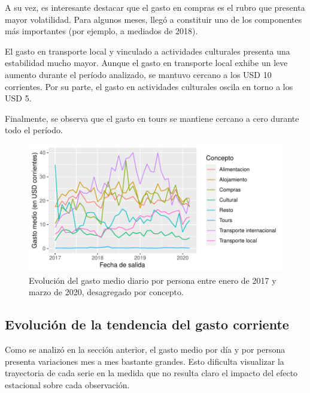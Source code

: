 \documentclass[
]{article}
\begin{document}
A su vez, es interesante destacar que el gasto en compras es el rubro
que presenta mayor volatilidad. Para algunos meses, llegó a constituir
uno de los componentes más importantes (por ejemplo, a mediados de
2018).

El gasto en transporte local y vinculado a actividades culturales
presenta una estabilidad mucho mayor. Aunque el gasto en transporte
local exhibe un leve aumento durante el período analizado, se mantuvo
cercano a los USD 10 corrientes. Por su parte, el gasto en actividades
culturales oscila en torno a los USD 5.

Finalmente, se observa que el gasto en tours se mantiene cercano a cero
durante todo el período.

\begin{figure}[H]

{\centering \includegraphics{Informe-Proyectofinal_files/figure-latex/evolucion_gasto-1} 

}

\caption{Evolución del gasto medio diario por persona entre enero de 2017 y marzo de 2020, desagregado por concepto.}\label{fig:evolucion_gasto}
\end{figure}

\hypertarget{evoluciuxf3n-de-la-tendencia-del-gasto-corriente}{%
\subsection{Evolución de la tendencia del gasto
corriente}\label{evoluciuxf3n-de-la-tendencia-del-gasto-corriente}}

Como se analizó en la sección anterior, el gasto medio por día y por
persona presenta variaciones mes a mes bastante grandes. Esto dificulta
visualizar la trayectoria de cada serie en la medida que no resulta
claro el impacto del efecto estacional sobre cada observación.
\end{document}
